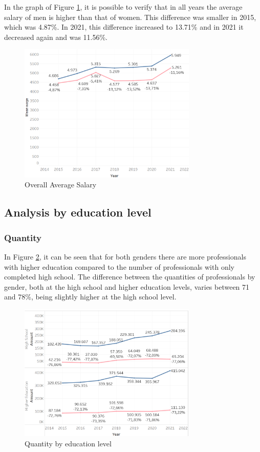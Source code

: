 In the graph of Figure \ref{fig_1_sal}, it is possible to verify that in all years the average salary of men is higher than that of women. This difference was smaller in 2015, which was 4.87\%. In 2021, this difference increased to 13.71\% and in 2021 it decreased again and was 11.56\%.

\begin{figure}[htbp]
	\centerline{
		\includegraphics[width=85mm]{assets/1_sal.PNG}
	}
	\caption{Overall Average Salary}
	\label{fig_1_sal}
\end{figure}


\subsection{Analysis by education level}  \label{sub:educ}

\subsubsection{Quantity}

In Figure \ref{fig_2_qnt_educ}, it can be seen that for both genders there are more professionals with higher education compared to the number of professionals with only completed high school. The difference between the quantities of professionals by gender, both at the high school and higher education levels, varies between 71 and 78\%, being slightly higher at the high school level.

\begin{figure}[htbp]
	\centerline{
		\includegraphics[width=85mm]{assets/2_qnt_educ.PNG}
	}
	\caption{Quantity by education level}
	\label{fig_2_qnt_educ}
\end{figure}

